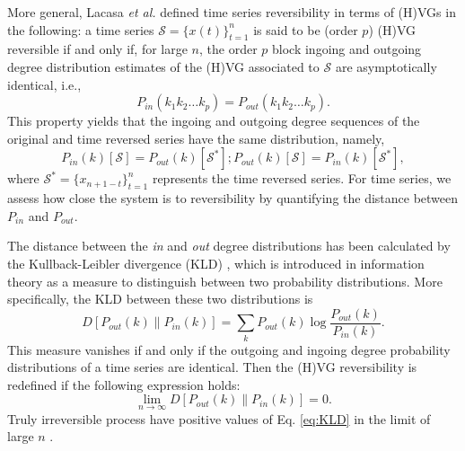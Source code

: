 		More general, Lacasa \textit{et al.} \cite{Lacasa2015} defined time series reversibility in terms of (H)VGs in the following: a time series $\mathcal{S} = \{ x(t) \}_{t=1}^n$ is said to be (order $p$) (H)VG reversible if and only if, for large $n$, the order $p$ block ingoing and outgoing degree distribution estimates of the (H)VG associated to $\mathcal{S}$ are asymptotically identical, i.e., 
\begin{equation}
P_{in}(k_1 k_2 \dots k_p) = P_{out}(k_1 k_2 \dots k_p).
\end{equation}
This property yields that the ingoing and outgoing degree sequences of the original and time reversed series have the same distribution, namely, 
\begin{equation}
P_{in}(k) [\mathcal{S}] = P_{out}(k) [ \mathcal{S}^{\ast}]; P_{out}(k) [\mathcal{S}] = P_{in}(k)[\mathcal{S}^{\ast}],  
\end{equation}
where $\mathcal{S}^{\ast} = \{ x_{n+1-t} \}_{t=1}^{n}$ represents the time reversed series. For time series, we assess how close the system is to reversibility by quantifying the distance between $P_{in}$ and $P_{out}$.  

		The distance between the \textit{in} and \textit{out} degree distributions has been calculated by the Kullback-Leibler divergence (KLD) \cite{Lacasa2012,Lacasa2015}, which is introduced in information theory as a measure to distinguish between two probability distributions. More specifically, the KLD between these two distributions is
\begin{equation}\label{eq:KLD}
D[P_{out}(k) \| P_{in}(k)] = \sum_{k} P_{out}(k) \log \frac{P_{out}(k)}{P_{in}(k)}. 
\end{equation}
This measure vanishes if and only if the outgoing and ingoing degree probability distributions of a time series are identical. Then the (H)VG reversibility is redefined if the following expression holds:
\begin{equation}
\lim_{n \to \infty} D[P_{out}(k) \| P_{in}(k)] = 0. 
\end{equation}		
Truly irreversible process have positive values of Eq. \eqref{eq:KLD} in the limit of large $n$ \cite{Lacasa2012}.

